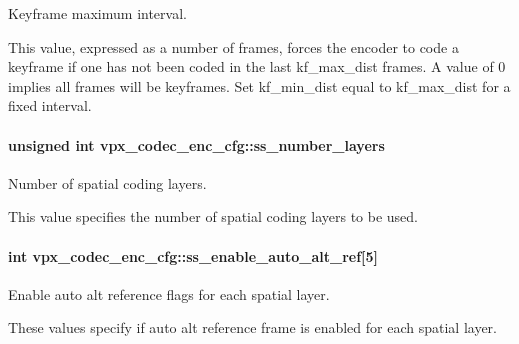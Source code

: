 Keyframe maximum interval. 

This value, expressed as a number of frames, forces the encoder to code a keyframe if one has not been coded in the last kf\+\_\+max\+\_\+dist frames. A value of 0 implies all frames will be keyframes. Set kf\+\_\+min\+\_\+dist equal to kf\+\_\+max\+\_\+dist for a fixed interval. 
\paragraph[{\texorpdfstring{ss\+\_\+number\+\_\+layers}{ss_number_layers}}]{\setlength{\rightskip}{0pt plus 5cm}unsigned int vpx\+\_\+codec\+\_\+enc\+\_\+cfg\+::ss\+\_\+number\+\_\+layers}\hypertarget{structvpx__codec__enc__cfg_a1e5e1d00b22f2ba8c5c7230f31900f95}{}\label{structvpx__codec__enc__cfg_a1e5e1d00b22f2ba8c5c7230f31900f95}


Number of spatial coding layers. 

This value specifies the number of spatial coding layers to be used. 
\paragraph[{\texorpdfstring{ss\+\_\+enable\+\_\+auto\+\_\+alt\+\_\+ref}{ss_enable_auto_alt_ref}}]{\setlength{\rightskip}{0pt plus 5cm}int vpx\+\_\+codec\+\_\+enc\+\_\+cfg\+::ss\+\_\+enable\+\_\+auto\+\_\+alt\+\_\+ref\mbox{[}5\mbox{]}}\hypertarget{structvpx__codec__enc__cfg_a26e33bbfa43485c21ea58da6cee23c36}{}\label{structvpx__codec__enc__cfg_a26e33bbfa43485c21ea58da6cee23c36}


Enable auto alt reference flags for each spatial layer. 

These values specify if auto alt reference frame is enabled for each spatial layer. 
